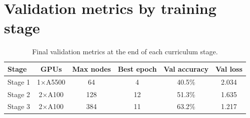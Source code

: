 \documentclass[11pt,letterpaper]{article}
\begin{document}
\section{Validation metrics by training stage}
\label{sec:training_detail}

\begin{table}[!ht]
\centering
\caption{Final validation metrics at the end of each curriculum stage.}
\label{tab:training_stages}
\begin{tabular}{lccccc}
\toprule
Stage & GPUs & Max nodes & Best epoch & Val accuracy & Val loss \\
\midrule
Stage 1 & 1$\times$A5500 & 64  & 4  & 40.5\% & 2.034 \\
Stage 2 & 2$\times$A100  & 128 & 12 & 51.3\% & 1.635 \\
Stage 3 & 2$\times$A100  & 384 & 11 & 63.2\% & 1.217 \\
\bottomrule
\end{tabular}
\end{table}

\clearpage


\end{document}
